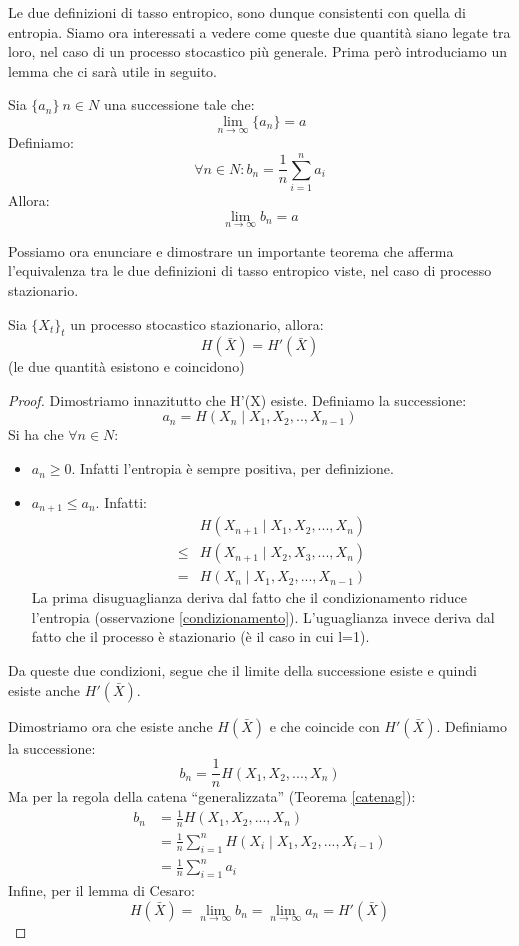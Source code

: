 Le due definizioni di tasso entropico, sono dunque consistenti con quella di entropia. Siamo ora interessati a vedere come queste 
due quantità siano legate tra loro, nel caso di un processo stocastico più generale.
Prima però introduciamo un lemma che ci sarà utile in seguito.

\begin{lemma}
Sia $\{a_n\} \ n \in N$ una successione tale che:
\[
 \lim_{n \to \infty} \{a_n\}=a
\]
Definiamo:
\[
 \forall n \in N: b_n=\frac{1}{n} \sum_{i=1}^n a_i
\]
Allora:
\[
 \lim_{n \to \infty} b_n=a
\]
\end{lemma}

Possiamo ora enunciare e dimostrare un importante teorema che afferma l'equivalenza tra le due definizioni di tasso entropico viste, 
nel caso di processo stazionario.

\begin{teorema}
Sia $\{X_t\}_t$ un processo stocastico stazionario, allora:
\[
 H(\bar{X})=H'(\bar{X})
\]
(le due quantità esistono e coincidono)
 \begin{proof}
 \mbox{}

 Dimostriamo innazitutto che H'(X) esiste.
 Definiamo la successione: 
 \[
  a_n=H(X_n \mid X_1,X_2,..,X_{n-1})
 \]
 Si ha che $\forall n \in N$:
 \begin{itemize}
 \item $a_n \ge 0$. Infatti l'entropia è sempre positiva, per definizione.
 \item $a_{n+1} \le a_n$. Infatti:
 \[\begin{split}
   &H(X_{n+1} \mid X_1,X_2,...,X_n)  \\
   \le &H(X_{n+1} \mid X_2,X_3,...,X_n) \\
   = &H(X_{n} \mid X_1,X_2,...,X_{n-1})
   \end{split}
 \]
 La prima disuguaglianza deriva dal fatto che il condizionamento riduce l'entropia (osservazione \ref{condizionamento}). L'uguaglianza invece deriva dal fatto che il processo è stazionario (è il caso in cui l=1).
 \end{itemize}

 \noindent
 Da queste due condizioni, segue che il limite della successione esiste e quindi esiste anche $H'(\bar{X})$.
 
 \noindent
 Dimostriamo ora che esiste anche $H(\bar{X})$ e che coincide con $H'(\bar{X})$.
 Definiamo la successione:
 \[
  b_n=\frac{1}{n} H(X_1,X_2,...,X_n)
 \]
 Ma per la regola della catena ``generalizzata'' (Teorema \ref{catenag}):
 \[\begin{split}
  b_n &=\frac{1}{n} H(X_1,X_2,...,X_n) \\
      &=\frac{1}{n} \sum_{i=1}^n H(X_i \mid X_1,X_2,...,X_{i-1}) \\
      &=\frac{1}{n} \sum_{i=1}^n a_i
   \end{split}
 \]
 Infine, per il lemma di Cesaro:
 \[
  H(\bar{X})=\lim_{n \to \infty} b_n= \lim_{n \to \infty} a_n=H'(\bar{X})
 \]


 \end{proof}
 
\end{teorema}

